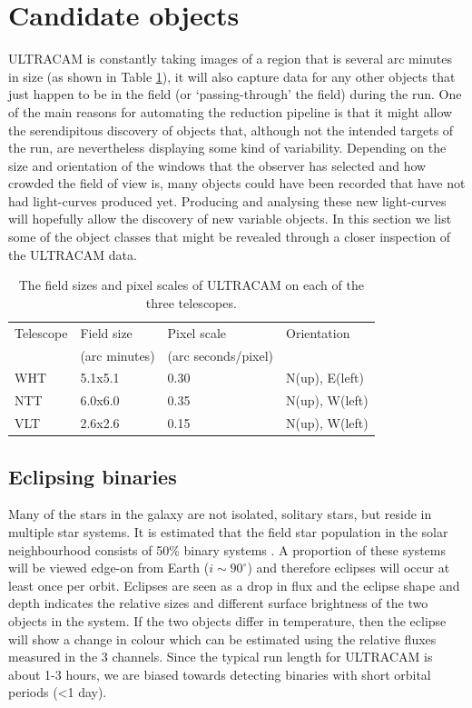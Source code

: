 \section{Candidate objects}
ULTRACAM is constantly taking images of a region that is several arc minutes in size (as shown in Table \ref{tab:pixelscale}), it will also capture data for any other objects that just happen to be in the field (or `passing-through' the field) during the run. One of the main reasons for automating the reduction pipeline is that it  might allow the serendipitous discovery of objects that, although not the intended targets of the run, are nevertheless displaying some kind of variability. Depending on the size and orientation of the windows that the observer has selected and how crowded the field of view is, many objects could have been recorded that have not had light-curves produced yet. Producing and analysing these new light-curves will hopefully allow the discovery of new variable objects.  In this section we list some of the object classes that might be revealed through a closer inspection of the ULTRACAM data.


\begin{table}
	\caption{The field sizes and pixel scales of ULTRACAM on each of the three telescopes.}
	\begin{tabularx}{\textwidth}{l l l l}
		\hline
		Telescope & Field size        & Pixel scale & Orientation \\
		                  & (arc minutes) &   (arc seconds/pixel) & \\
		\hline
		WHT & 5.1x5.1 & 0.30 & N(up), E(left)\\
		NTT & 6.0x6.0 & 0.35 & N(up), W(left)\\
		VLT & 2.6x2.6 & 0.15 & N(up), W(left)\\
		\hline
	\end{tabularx}
	\label{tab:pixelscale}
\end{table}


\subsection{Eclipsing binaries}
Many of the stars in the galaxy are not isolated, solitary stars, but reside in multiple star systems. It is estimated that the field star population in the solar neighbourhood consists of 50\% binary systems \citep{binaryfraction}. A proportion of these systems will be viewed edge-on from Earth ($i \sim 90^\circ$) and therefore eclipses will occur at least once per orbit. Eclipses are seen as a drop in flux and the eclipse shape and depth indicates the relative sizes and different surface brightness of the two objects in the system. If the two objects differ in temperature, then the eclipse will show a change in colour which can be estimated using the relative fluxes measured in the 3 channels. Since the typical run length for ULTRACAM is about 1-3 hours, we are biased towards detecting binaries with short orbital periods (\textless 1 day). 

